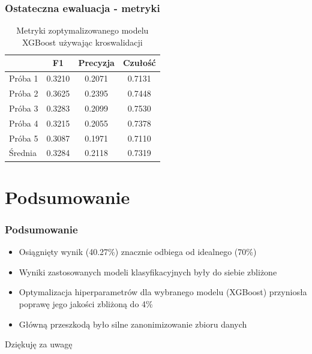 \documentclass{beamer}
\begin{document}
    \begin{frame}
        \frametitle{Ostateczna ewaluacja - metryki}
        \begin{table}
            \begin{tabular}{l|*{3}{c}}
                & F1 & Precyzja & Czułość \\
                \hline
                Próba 1 & 0.3210 & 0.2071 & 0.7131 \\
                Próba 2 & 0.3625 & 0.2395 & 0.7448 \\
                Próba 3 & 0.3283 & 0.2099 & 0.7530 \\
                Próba 4 & 0.3215 & 0.2055 & 0.7378 \\
                Próba 5 & 0.3087 & 0.1971 & 0.7110 \\
                \hline
                Średnia & 0.3284 & 0.2118 & 0.7319 \\
            \end{tabular}
            \caption{Metryki zoptymalizowanego modelu XGBoost używając kroswalidacji}
            \label{tab:xgb-score-comparison2}
        \end{table}
    \end{frame}

    \section{Podsumowanie}

    \begin{frame}
        \frametitle{Podsumowanie}
        \begin{itemize}
            \item Osiągnięty wynik (40.27\%) znacznie odbiega od idealnego (70\%)
            \item Wyniki zastosowanych modeli klasyfikacyjnych były do siebie zbliżone
            \item Optymalizacja hiperparametrów dla wybranego modelu (XGBoost) przyniosła poprawę jego jakości zbliżoną do 4\%
            \item Główną przeszkodą było silne zanonimizowanie zbioru danych
        \end{itemize}
    \end{frame}

    \begin{frame}[standout]
        \centering
        Dziękuję za uwagę
    \end{frame}
\end{document}
